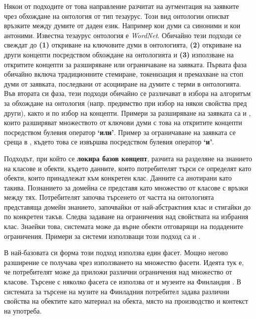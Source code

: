 \documentclass[a4paper,12pt]{article}
\begin{document}
\bigbreak

Някои от подходите от това направление разчитат на аугментация на заявките чрез обхождане на онтология от тип тезаурус. Този вид онтологии описват връзките между думите от даден език. Например кои думи са синоними и кои антоними. Известна тезаурус онтология е \textit{WordNet}. Обичайно тези подходи се свеждат до \textbf{(1)} откриване на ключовите думи в онтологията, \textbf{(2)} откриване на други концепти посредством обхождане на онтологията и \textbf{(3)} използване на откритите концепти за разширяване или ограничаване на заявката. Първата фаза обичайно включа традиционните стемиране, токенизация и премахване на стоп думи от заявката, последвани от асоцииране на думите с терми в онтологията. Във втората си фаза, тези подходи обичайно се различават в избора на алгоритъм за обхождане на онтология (напр. предимство при избор на някои свойства пред други), както и по избор на концепти. Примери за разширяване на заявката са \cite{wordnetinternetsearches} и \cite{wordnetgeo}, които разширяват множеството от ключови думи с това на откритите концепти посредством булевия оператор \textbf{`или'}. Пример за ограничаване на заявката се среща в \cite{cleversearch}, където това се извършва посредством булевия оператор \textbf{`и'}.

\bigbreak

Подходът, при който се \textbf{локира базов концепт}, разчита на разделяне на знанието на класове и обекти, където данните, които потребителят търси се определят като обекти, които принадлежат към конкретен клас. Данните са анотирани като такива. Познанието за домейна се представя като множество от класове с връзки между тях. Потребителят започва търсенето от частта на онтологията представяща домейн знанието, започвайки от най-абстрактния клас и стигайки до по конкретен такъв. Следва задаване на ограничения над свойствата на избрания клас. Знаейки това, системата може да върне обекти отговарящи на подадените ограничения. Примери за системи използващи този подход са \cite{shoe} и \cite{seal}.

\bigbreak

В най-базовата си форма този подход използва един фасет. Мощно негово разширение се получава чрез използването на множество фасети. Идеята тук е, че потребителят може да приложи различни ограничения над множество от класове. Търсене с няколко фасета се използва от \cite{ontoviews} и музеите на Финландия \cite{finlandmuseum}. В системата за търсене на музите на Финладния потребител задава различни свойства на обектите като материал на обекта, място на производство и контекст на употреба.
\end{document}
